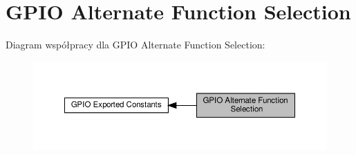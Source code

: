 \hypertarget{group___g_p_i_o___alternate__function__selection}{}\section{G\+P\+IO Alternate Function Selection}
\label{group___g_p_i_o___alternate__function__selection}
Diagram współpracy dla G\+P\+IO Alternate Function Selection\+:\nopagebreak
\begin{figure}[H]
\begin{center}
\leavevmode
\includegraphics[width=350pt]{group___g_p_i_o___alternate__function__selection}
\end{center}
\end{figure}
